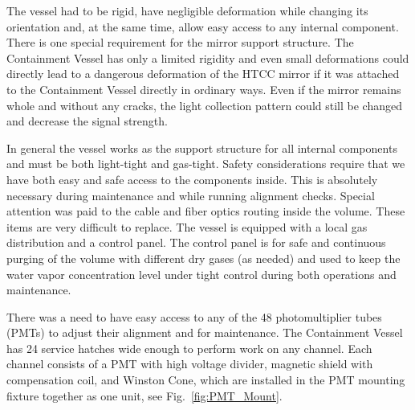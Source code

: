 The vessel had to be rigid, have negligible deformation while changing its orientation and, at the same time, allow
easy access to any internal component. There is one special requirement for the mirror support structure. The
Containment Vessel has only a limited rigidity and even small deformations could directly lead to a dangerous
deformation of the HTCC mirror if it was attached to the Containment Vessel directly in ordinary ways. Even if the
mirror remains whole and without any cracks, the light collection pattern could still be changed and decrease the
signal strength.

In general the vessel works as the support structure for all internal components and must be both light-tight and
gas-tight. Safety considerations require that we have both easy and safe access to the components inside. This is
absolutely necessary during maintenance and while running alignment checks. Special attention was paid to the cable
and fiber optics routing inside the volume. These items are very difficult to replace. The vessel is equipped with a
local gas distribution and a control panel. The control panel is for safe and continuous purging of the volume with
different dry gases (as needed) and used to keep the water vapor concentration level under tight control during
both operations and maintenance.

There was a need to have easy access to any of the 48 photomultiplier tubes (PMTs) to adjust their alignment and
for maintenance. The Containment Vessel has 24 service hatches wide enough to perform work on any channel. Each
channel consists of a PMT with high voltage divider, magnetic shield with compensation coil, and Winston Cone, which
are installed in the PMT mounting fixture together as one unit, see Fig.~\ref{fig:PMT_Mount}.

